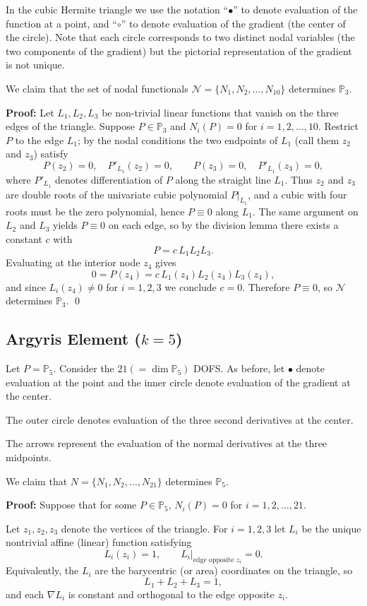 In the cubic Hermite triangle we use the notation ``\(\bullet\)'' to denote evaluation of the function at a point, and ``\(\circ\)'' to denote evaluation of the gradient (the center of the circle). Note that each circle corresponds to two distinct nodal variables (the two components of the gradient) but the pictorial representation of the gradient is not unique.

We claim that the set of nodal functionals
$\mathcal{N} = \{N_1, N_2, \dots, N_{10}\}$ determines $\mathbb{P}_3$.

\textbf{Proof:}
Let $L_1,L_2,L_3$ be non-trivial linear functions that vanish on the three edges of the triangle. Suppose $P\in\mathbb{P}_3$ and $N_i(P)=0$ for $i=1,2,\dots,10$. Restrict $P$ to the edge $L_1$; by the nodal conditions the two endpoints of $L_1$ (call them $z_2$ and $z_3$) satisfy
\[P(z_2)=0,\quad P'_{L_1}(z_2)=0,\qquad P(z_3)=0,\quad P'_{L_1}(z_3)=0,\]
where $P'_{L_1}$ denotes differentiation of $P$ along the straight line $L_1$. Thus $z_2$ and $z_3$ are double roots of the univariate cubic polynomial $P\big|_{L_1}$, and a cubic with four roots must be the zero polynomial, hence $P\equiv0$ along $L_1$. The same argument on $L_2$ and $L_3$ yields $P\equiv0$ on each edge, so by the division lemma there exists a constant $c$ with
\[P = c\,L_1L_2L_3.\]
Evaluating at the interior node $z_4$ gives
\[0 = P(z_4) = c\,L_1(z_4)L_2(z_4)L_3(z_4),\]
and since $L_i(z_4)\neq0$ for $i=1,2,3$ we conclude $c=0$. Therefore $P\equiv0$, so $\mathcal{N}$ determines $\mathbb{P}_3$. \qed
\subsection*{Argyris Element ($k=5$)}

Let $P = \mathbb{P}_5$. Consider the $21 (= \dim \mathbb{P}_5)$ DOFS.
As before, let $\bullet$ denote evaluation at the point and the inner circle denote evaluation of the gradient at the center.

The outer circle denotes evaluation of the three second derivatives at the center.

The arrows represent the evaluation of the normal derivatives at the three
midpoints.

We claim that $N = \{N_1, N_2, \dots, N_{21}\}$ determines $\mathbb{P}_5$.

\textbf{Proof:}
Suppose that for some $P \in \mathbb{P}_5$, $N_i(P) = 0$ for $i = 1,2, \dots, 21$.

Let $z_1,z_2,z_3$ denote the vertices of the triangle. For $i=1,2,3$ let $L_i$ be the unique nontrivial affine (linear) function satisfying
\[
    L_i(z_i)=1,\qquad L_i|_{\text{edge opposite }z_i}=0.
\]
Equivalently, the $L_i$ are the barycentric (or area) coordinates on the triangle, so
\[
    L_1+L_2+L_3=1,
\]
and each $\nabla L_i$ is constant and orthogonal to the edge opposite $z_i$.


